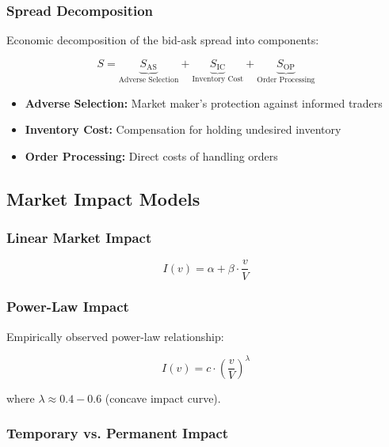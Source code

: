 \documentclass[12pt,a4paper]{article}
\begin{document}
\subsubsection{Spread Decomposition}

Economic decomposition of the bid-ask spread into components:

\begin{equation}
S = \underbrace{S_{\text{AS}}}_{\text{Adverse Selection}} + \underbrace{S_{\text{IC}}}_{\text{Inventory Cost}} + \underbrace{S_{\text{OP}}}_{\text{Order Processing}}
\end{equation}

\begin{itemize}
    \item \textbf{Adverse Selection:} Market maker's protection against informed traders
    \item \textbf{Inventory Cost:} Compensation for holding undesired inventory
    \item \textbf{Order Processing:} Direct costs of handling orders
\end{itemize}

\subsection{Market Impact Models}

\subsubsection{Linear Market Impact}

\begin{equation}
I(v) = \alpha + \beta \cdot \frac{v}{V}
\end{equation}

\subsubsection{Power-Law Impact}

Empirically observed power-law relationship:

\begin{equation}
I(v) = c \cdot \left(\frac{v}{V}\right)^{\lambda}
\end{equation}

where $\lambda \approx 0.4-0.6$ (concave impact curve).

\subsubsection{Temporary vs. Permanent Impact}
\end{document}
